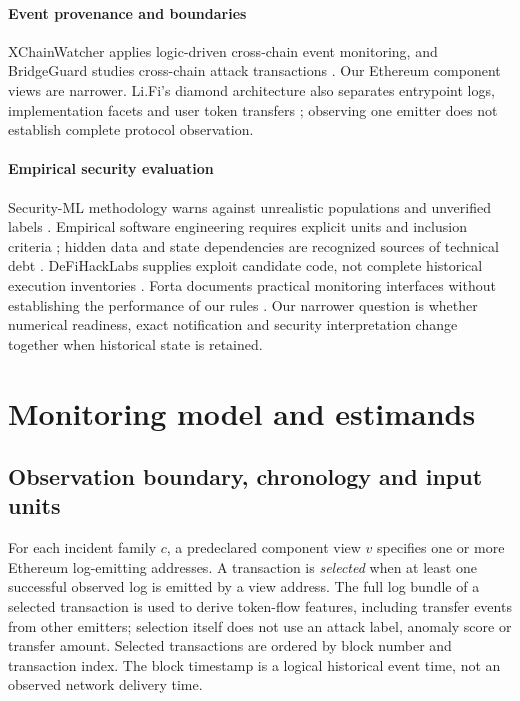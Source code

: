 \documentclass[preprint,12pt,authoryear]{elsarticle}
\begin{document}
\paragraph{Event provenance and boundaries} XChainWatcher applies logic-driven cross-chain event monitoring, and BridgeGuard studies cross-chain attack transactions \citep{Augusto2025XChainWatcher,Wu2025BridgeGuard}. Our Ethereum component views are narrower. Li.Fi's diamond architecture also separates entrypoint logs, implementation facets and user token transfers \citep{Mudge2020ERC2535,BlockSec2022LiFi}; observing one emitter does not establish complete protocol observation.

\paragraph{Empirical security evaluation} Security-ML methodology warns against unrealistic populations and unverified labels \citep{Sommer2010ClosedWorld,Arp2022Dons}. Empirical software engineering requires explicit units and inclusion criteria \citep{Kitchenham2004Evidence,Wohlin2012Experimentation}; hidden data and state dependencies are recognized sources of technical debt \citep{Sculley2015Debt}. DeFiHackLabs supplies exploit candidate code, not complete historical execution inventories \citep{DeFiHackLabs2026}. Forta documents practical monitoring interfaces without establishing the performance of our rules \citep{FortaDocs}. Our narrower question is whether numerical readiness, exact notification and security interpretation change together when historical state is retained.

\section{Monitoring model and estimands}\label{sec:model}

\subsection{Observation boundary, chronology and input units}
For each incident family $c$, a predeclared component view $v$ specifies one or more Ethereum log-emitting addresses. A transaction is \emph{selected} when at least one successful observed log is emitted by a view address. The full log bundle of a selected transaction is used to derive token-flow features, including transfer events from other emitters; selection itself does not use an attack label, anomaly score or transfer amount. Selected transactions are ordered by block number and transaction index. The block timestamp is a logical historical event time, not an observed network delivery time.
\end{document}
